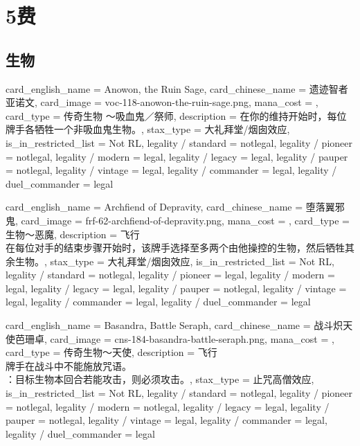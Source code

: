 \documentclass[lang = cn, color = black, 10pt]{AllThatStax}
\begin{document}
\chapter{5费}

\section{生物}

\card
{
	card_english_name = {Anowon, the Ruin Sage},
	card_chinese_name = {遗迹智者亚诺文},
	card_image = voc-118-anowon-the-ruin-sage.png,
	mana_cost = ,
	card_type = 传奇生物 ～吸血鬼／祭师,
	description = {在你的维持开始时，每位牌手各牺牲一个非吸血鬼生物。},
	stax_type = 大礼拜堂/烟囱效应,
	is_in_restricted_list = Not RL,
	legality / standard = notlegal,
	legality / pioneer = notlegal,
	legality / modern = legal,
	legality / legacy = legal,
	legality / pauper = notlegal,
	legality / vintage = legal,
	legality / commander = legal,
	legality / duel_commander = legal
}

\card
{
	card_english_name = {Archfiend of Depravity},
	card_chinese_name = {堕落翼邪鬼},
	card_image = frf-62-archfiend-of-depravity.png,
	mana_cost = ,
	card_type = 生物～恶魔,
	description = {飞行\\
在每位对手的结束步骤开始时，该牌手选择至多两个由他操控的生物，然后牺牲其余生物。},
	stax_type = 大礼拜堂/烟囱效应,
	is_in_restricted_list = Not RL,
	legality / standard = notlegal,
	legality / pioneer = legal,
	legality / modern = legal,
	legality / legacy = legal,
	legality / pauper = notlegal,
	legality / vintage = legal,
	legality / commander = legal,
	legality / duel_commander = legal
}

\card
{
	card_english_name = {Basandra, Battle Seraph},
	card_chinese_name = {战斗炽天使芭珊卓},
	card_image = cns-184-basandra-battle-seraph.png,
	mana_cost = ,
	card_type = 传奇生物～天使,
	description = {飞行\\
牌手在战斗中不能施放咒语。\\
：目标生物本回合若能攻击，则必须攻击。},
	stax_type = 止咒高僧效应,
	is_in_restricted_list = Not RL,
	legality / standard = notlegal,
	legality / pioneer = notlegal,
	legality / modern = notlegal,
	legality / legacy = legal,
	legality / pauper = notlegal,
	legality / vintage = legal,
	legality / commander = legal,
	legality / duel_commander = legal
}
\end{document}
